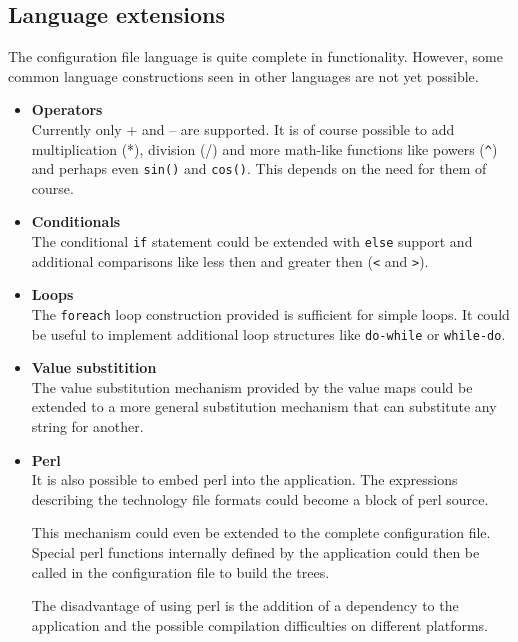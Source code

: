 \subsection{Language extensions}
The configuration file language is quite complete in functionality. However,
some common language constructions seen in other languages are not yet
possible.
\begin{itemize}
\item \textbf{Operators\\ } Currently only + and -- are supported. It is of
course possible to add multiplication (*), division (/) and more math-like
functions like powers (\verb=^=) and perhaps even \verb=sin()= and
\verb=cos()=. This depends on the need for them of course.
\item \textbf{Conditionals\\ } The conditional \verb=if= statement could be
extended with \verb=else= support and additional comparisons like less then and
greater then (\verb=<= and \verb=>=).
\item \textbf{Loops\\ } The \verb=foreach= loop construction provided is
sufficient for simple loops. It could be useful to implement additional loop
structures like \verb=do-while= or \verb=while-do=.
\item \textbf{Value substitition\\ } The value substitution mechanism provided
by the value maps could be extended to a more general substitution mechanism
that can substitute any string for another.
\item \textbf{Perl\\ } It is also possible to embed perl into the application.
The expressions describing the technology file formats could become a block of
perl source.

This mechanism could even be extended to the complete configuration file.
Special perl functions internally defined by the application could then be
called in the configuration file to build the trees.

The disadvantage of using perl is the addition of a dependency to the
application and the possible compilation difficulties on different platforms.
\end{itemize}

